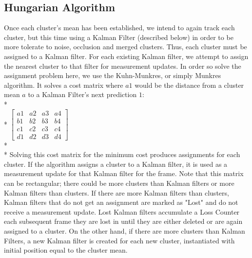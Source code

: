 \documentclass[draft]{article} %
\begin{document}
\subsection{Hungarian Algorithm}
Once each cluster's mean has been established, we intend to again track each cluster, but this time using a Kalman Filter (described below) in order to be more tolerate to noise, occlusion and merged clusters. Thus, each cluster must be assigned to a Kalman filter. For each existing Kalman filter, we attempt to assign the nearest cluster to that filter for measurement updates. In order so solve the assignment problem here, we use the Kuhn-Munkres, or simply Munkres algorithm. \cite{munkres1957algorithms} It solves a cost matrix where $a1$ would be the distance from a cluster mean $a$ to a Kalman Filter's next prediction $1$:\\*\\*
$\begin{bmatrix}
a1 & a2 & a3 & a4\\
b1 & b2 & b3 & b4\\
c1 & c2 & c3 & c4\\
d1 & d2 & d3 & d4\end{bmatrix}$\\*\\*
Solving this cost matrix for the minimum cost produces assignments for each cluster. If the algorithm assigns a cluster to a Kalman filter, it is used as a measurement update for that Kalman filter for the frame. Note that this matrix can be rectangular; there could be more clusters than Kalman filters or more Kalman filters than clusters. If there are more Kalman filters than clusters, Kalman filters that do not get an assignment are marked as "Lost" and do not receive a measurement update. Lost Kalman filters accumulate a Loss Counter each subsequent frame they are lost in until they are either deleted or are again assigned to a cluster.  On the other hand, if there are more clusters than Kalman Filters, a new Kalman filter is created for each new cluster, instantiated with initial position equal to the cluster mean.
\end{document}
